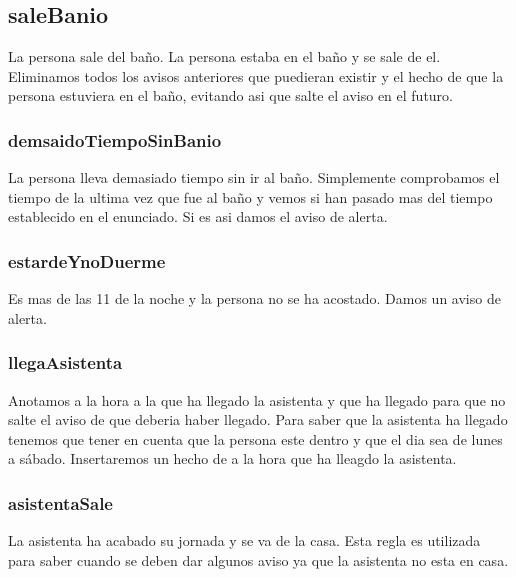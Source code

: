 \documentclass[12pt,a4paper]{article}
\begin{document}
\subsection{saleBanio}
La persona sale del baño. La persona estaba en el baño y se sale de el. Eliminamos todos los avisos anteriores que puedieran existir y el hecho de que la persona estuviera en el baño, evitando asi que salte el aviso en el futuro.
\subsubsection{demsaidoTiempoSinBanio}
La persona lleva demasiado tiempo sin ir al baño. Simplemente comprobamos el tiempo de la ultima vez que fue al baño y vemos si han pasado mas del tiempo establecido en el enunciado. Si es asi damos el aviso de alerta.
\subsubsection{estardeYnoDuerme}
Es mas de las 11 de la noche y la persona no se ha acostado. Damos un aviso  de alerta. 
\subsubsection{llegaAsistenta}
Anotamos a la hora a la que ha llegado la asistenta y que ha llegado para que no salte el aviso de que deberia haber llegado. Para saber que la asistenta ha llegado tenemos que tener en cuenta que la persona este dentro y que el dia sea de lunes a sábado. Insertaremos un hecho de a la hora que ha lleagdo la asistenta. 
\subsubsection{asistentaSale}
La asistenta ha acabado su jornada y se va de la casa. Esta regla es utilizada para saber cuando se deben dar algunos aviso ya que la asistenta no esta en casa.
\end{document}
